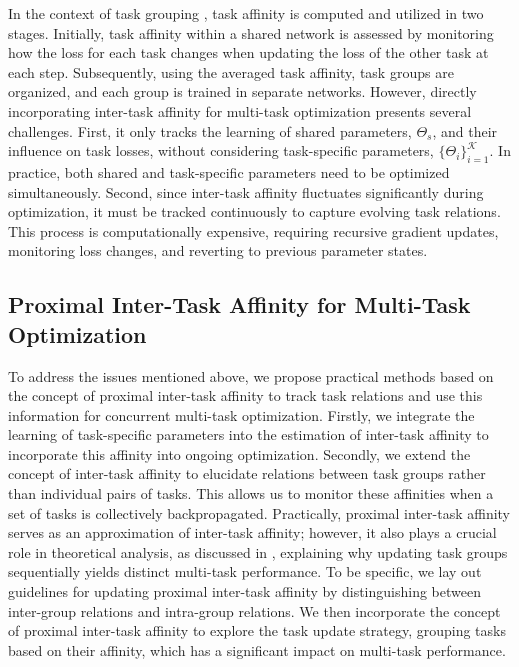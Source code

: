 In the context of task grouping \citep{fifty2021efficiently}, task affinity is computed and utilized in two stages. Initially, task affinity within a shared network is assessed by monitoring how the loss for each task changes when updating the loss of the other task at each step. Subsequently, using the averaged task affinity, task groups are organized, and each group is trained in separate networks. However, directly incorporating inter-task affinity for multi-task optimization presents several challenges. First, it only tracks the learning of shared parameters, $\Theta_s$, and their influence on task losses, without considering task-specific parameters, $\{\Theta_i\}_{i=1}^{\mathcal{K}}$. In practice, both shared and task-specific parameters need to be optimized simultaneously. Second, since inter-task affinity fluctuates significantly during optimization, it must be tracked continuously to capture evolving task relations. This process is computationally expensive, requiring recursive gradient updates, monitoring loss changes, and reverting to previous parameter states.

\subsection{Proximal Inter-Task Affinity for Multi-Task Optimization}
\label{sec:track_prox}
To address the issues mentioned above, we propose practical methods based on the concept of proximal inter-task affinity to track task relations and use this information for concurrent multi-task optimization. Firstly, we integrate the learning of task-specific parameters into the estimation of inter-task affinity to incorporate this affinity into ongoing optimization. Secondly, we extend the concept of inter-task affinity to elucidate relations between task groups rather than individual pairs of tasks. This allows us to monitor these affinities when a set of tasks is collectively backpropagated. Practically, proximal inter-task affinity serves as an approximation of inter-task affinity; however, it also plays a crucial role in theoretical analysis, as discussed in , explaining why updating task groups sequentially yields distinct multi-task performance. To be specific, we lay out guidelines for updating proximal inter-task affinity by distinguishing between inter-group relations and intra-group relations. We then incorporate the concept of proximal inter-task affinity to explore the task update strategy, grouping tasks based on their affinity, which has a significant impact on multi-task performance.

